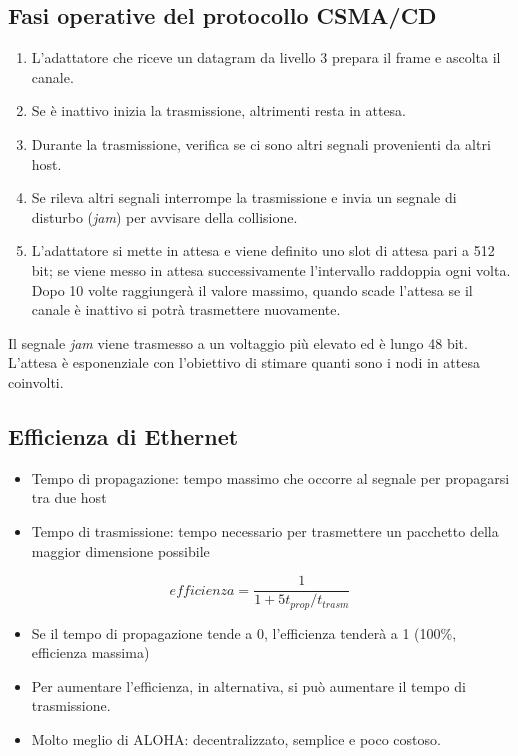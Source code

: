 \documentclass{report}
\begin{document}
\hypertarget{header-n167}{%
\subsection{Fasi operative del protocollo CSMA/CD}\label{header-n167}}

\begin{enumerate}
\def\labelenumi{\arabic{enumi}.}
\item
  L'adattatore che riceve un datagram da livello 3 prepara il frame e
  ascolta il canale.
\item
  Se è inattivo inizia la trasmissione, altrimenti resta in attesa.
\item
  Durante la trasmissione, verifica se ci sono altri segnali provenienti
  da altri host.
\item
  Se rileva altri segnali interrompe la trasmissione e invia un segnale
  di disturbo (\emph{jam}) per avvisare della collisione.
\item
  L'adattatore si mette in attesa e viene definito uno slot di attesa
  pari a 512 bit; se viene messo in attesa successivamente l'intervallo
  raddoppia ogni volta. Dopo 10 volte raggiungerà il valore massimo,
  quando scade l'attesa se il canale è inattivo si potrà trasmettere
  nuovamente.
\end{enumerate}

Il segnale \emph{jam} viene trasmesso a un voltaggio più elevato ed è
lungo 48 bit. L'attesa è esponenziale con l'obiettivo di stimare quanti
sono i nodi in attesa coinvolti.

\hypertarget{header-n180}{%
\subsection{Efficienza di Ethernet}\label{header-n180}}

\begin{itemize}
\item
  Tempo di propagazione: tempo massimo che occorre al segnale per
  propagarsi tra due host
\item
  Tempo di trasmissione: tempo necessario per trasmettere un pacchetto
  della maggior dimensione possibile
\end{itemize}

\[efficienza = \frac{1}{1+5t_{prop}/t_{trasm}}\]

\begin{itemize}
\item
  Se il tempo di propagazione tende a 0, l'efficienza tenderà a 1
  (100\%, efficienza massima)
\item
  Per aumentare l'efficienza, in alternativa, si può aumentare il tempo
  di trasmissione.
\item
  Molto meglio di ALOHA: decentralizzato, semplice e poco costoso.
\end{itemize}
\end{document}
